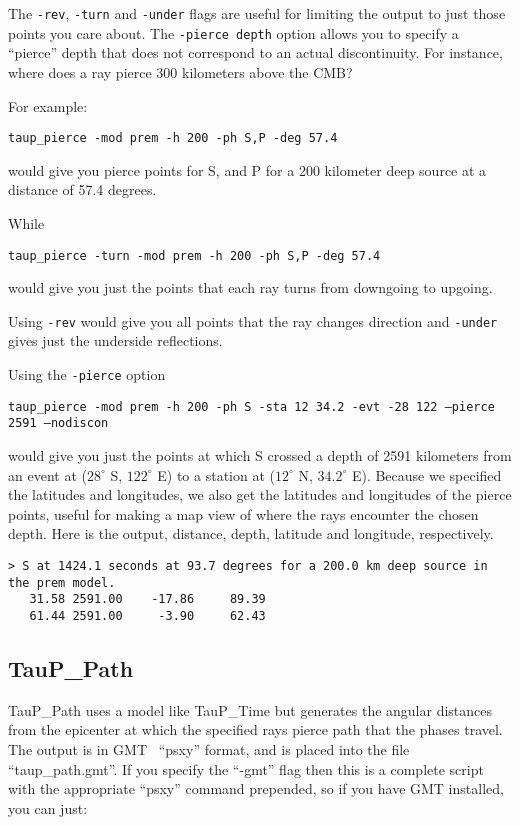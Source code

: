 The \texttt{-rev}, \texttt{-turn} and \texttt{-under} flags are useful 
for limiting the output
to just those points you care about. The \texttt{-pierce depth} option 
allows you
to specify a ``pierce'' depth that does not correspond to an
actual discontinuity. For instance, where does a ray pierce 300 kilometers
above the CMB?

For example:

\texttt{taup\_pierce -mod prem -h 200 -ph S,P -deg 57.4}

would give you pierce points for S, and P for a 200 kilometer
deep source at a distance of 57.4 degrees. 

While

\texttt{taup\_pierce -turn -mod prem -h 200 -ph S,P -deg 57.4}

would give you just the points that each ray turns from downgoing to upgoing.

Using \texttt{-rev} would give you all points that the ray changes direction and \texttt{-under} gives just the underside reflections. 

Using the \texttt{-pierce} option

\texttt{taup\_pierce -mod prem -h 200 -ph S -sta 12 34.2 -evt -28 122 --pierce 2591 --nodiscon}

would give you just the points at which S crossed a depth of 2591 kilometers
from an event at ($28^\circ$ S, $122^\circ$ E)
to a station at ($12^\circ$ N, $34.2^\circ$ E). 
Because we specified the latitudes and longitudes, we also get the 
latitudes and longitudes of 
the pierce points, useful for making
a map view of where the rays encounter the chosen depth. Here is the output,
distance, depth, latitude and longitude, respectively.
\begin{verbatim}
> S at 1424.1 seconds at 93.7 degrees for a 200.0 km deep source in the prem model.
   31.58 2591.00    -17.86     89.39
   61.44 2591.00     -3.90     62.43
\end{verbatim}

\subsection{TauP\_Path}
TauP\_Path uses a model like TauP\_Time but
generates  the
angular distances from the epicenter at which the specified rays pierce 
path that the phases travel. The output is in GMT~\cite{GMT} ``psxy'' format, and is
placed into the file ``taup\_path.gmt''. 
If you specify the ``-gmt'' flag then this 
is a complete script with the appropriate ``psxy'' command prepended, so if you
have GMT installed, you can just:

